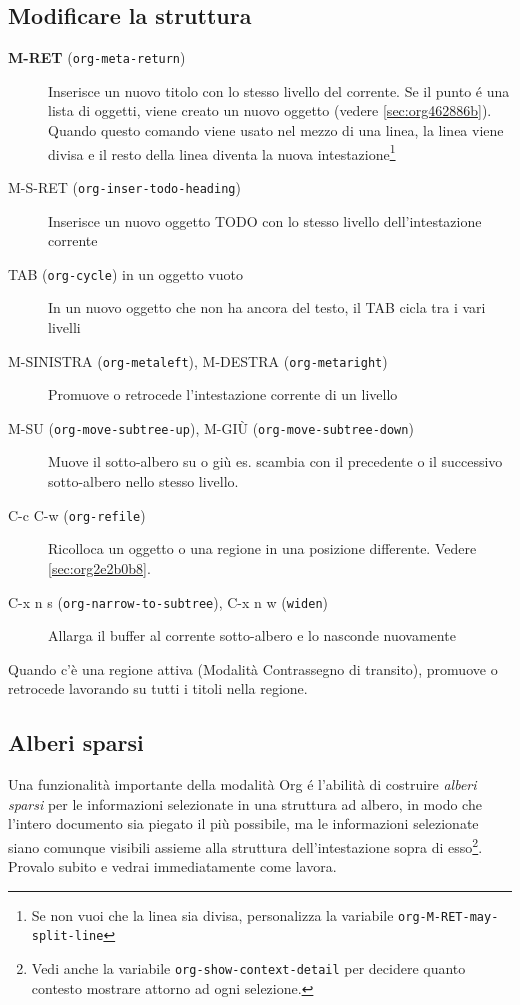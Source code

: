 \documentclass[11pt]{article}
\begin{document}
\subsection{Modificare la struttura}
\label{sec:orgcad88a0}
\begin{description}
\item[{\textbf{M-RET} (\texttt{org-meta-return})}] Inserisce un nuovo titolo con lo stesso livello del corrente. Se il
punto é una lista di oggetti, viene creato un nuovo oggetto (vedere
\ref{sec:org462886b}). Quando questo comando viene usato nel mezzo di
una linea, la linea viene divisa e il resto della linea diventa la
nuova intestazione\footnote{Se non vuoi che la linea sia divisa, personalizza la variabile
\texttt{org-M-RET-may-split-line}}

\item[{M-S-RET (\texttt{org-inser-todo-heading})}] Inserisce un nuovo oggetto TODO con lo stesso livello dell'intestazione corrente

\item[{TAB (\texttt{org-cycle}) in un oggetto vuoto}] In un nuovo oggetto che non ha ancora del testo, il TAB cicla tra i vari
livelli

\item[{M-SINISTRA (\texttt{org-metaleft}), M-DESTRA (\texttt{org-metaright})}] Promuove o retrocede l'intestazione corrente di un livello

\item[{M-SU (\texttt{org-move-subtree-up}), M-GIÙ (\texttt{org-move-subtree-down})}] Muove il sotto-albero su o giù es. scambia con il precedente o il
successivo sotto-albero nello stesso livello.

\item[{C-c C-w (\texttt{org-refile})}] Ricolloca un oggetto o una regione in una posizione differente. Vedere
\ref{sec:org2e2b0b8}.

\item[{C-x n s (\texttt{org-narrow-to-subtree}), C-x n w (\texttt{widen})}] Allarga il buffer al corrente sotto-albero e lo nasconde nuovamente
\end{description}

Quando c'è una regione attiva (Modalità Contrassegno di transito), promuove
o retrocede lavorando su tutti i titoli nella regione.

\subsection{Alberi sparsi}
\label{sec:org10abd71}
Una funzionalità importante della modalità Org é l'abilità di costruire
\emph{alberi sparsi} per le informazioni selezionate in una struttura ad albero,
in modo che l'intero documento sia piegato il più possibile, ma le
informazioni selezionate siano comunque visibili assieme alla struttura
dell'intestazione sopra di esso\footnote{Vedi anche la variabile \texttt{org-show-context-detail} per decidere
quanto contesto mostrare attorno ad ogni selezione.}. Provalo subito e vedrai immediatamente
come lavora.
\end{document}
